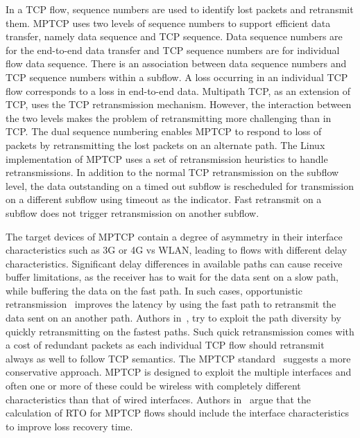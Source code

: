 \documentclass[10pt,conference]{IEEEtran}
\begin{document}
In a TCP flow, sequence numbers are used to identify lost packets and retransmit them. MPTCP uses two levels of sequence numbers to support 
efficient data transfer, namely data sequence and TCP sequence. Data sequence numbers are for the end-to-end data transfer and TCP sequence 
numbers are for individual flow data sequence. There is an association between data sequence numbers and TCP sequence numbers within a subflow.  
A loss occurring in an individual TCP flow corresponds to a loss in end-to-end data. Multipath TCP, as an extension of TCP, uses the 
TCP retransmission mechanism. However, the interaction between the two levels makes the problem of retransmitting more challenging than in TCP. The dual sequence 
numbering enables MPTCP to respond to loss of packets by retransmitting the lost packets on an alternate path.  
The Linux implementation of MPTCP uses a set of retransmission heuristics to handle retransmissions. In addition to the normal TCP retransmission 
on the subflow level, the data outstanding on a timed out subflow 
is rescheduled for transmission on a different subflow using timeout as the indicator. Fast retransmit on a subflow does not trigger 
retransmission on another subflow. 

The target devices of MPTCP contain a degree of asymmetry in their interface characteristics such as 3G or 
4G vs WLAN, leading to flows with different delay characteristics. Significant delay differences in available paths can cause receive buffer 
limitations, as the receiver has to wait for the data sent on a slow path, while buffering the data on the fast path. In such cases, opportunistic 
retransmission~\cite{Costin} improves the latency by using the fast path to retransmit the data sent on an another path. Authors in~\cite{fuso}, try 
to exploit the path diversity by quickly retransmitting on the fastest paths. Such quick retransmission comes with a cost of redundant packets as 
each individual TCP flow should retransmit always as well to follow TCP semantics. The MPTCP standard~\cite{rfc6824} suggests a more conservative 
approach. MPTCP is designed to exploit the multiple interfaces and often one or more of these could be wireless with completely different 
characteristics than that of wired interfaces. Authors in~\cite{Shin} argue that the calculation of RTO for MPTCP flows should include the 
interface characteristics to improve loss recovery time. 


\end{document}
